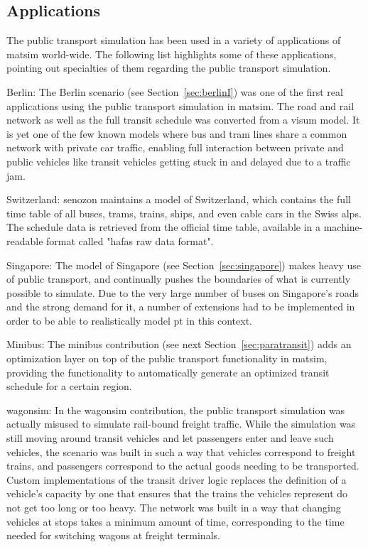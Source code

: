 \subsection{Applications}
The public transport simulation has been used in a variety of applications of
\gls{matsim} world-wide. The following list highlights some of these applications,
pointing out specialties of them regarding the public transport simulation.

\begin{compactitem}
	\item Berlin: The Berlin scenario (see Section~\ref{sec:berlinI}) was one of
	the first real applications using the public transport simulation in \gls{matsim}.
	The road and rail network as well as the full transit schedule was converted
	from a \gls{visum} model. It is yet one of the few known models where bus and tram
	lines share a common network with private car traffic, enabling full
	interaction between private and public vehicles like transit vehicles getting
	stuck in and delayed due to a traffic jam.
	\item Switzerland: \gls{senozon} maintains a model of Switzerland, which contains the
	full time table of all buses, trams, trains, ships, and even cable cars in the
	Swiss alps. The schedule data is retrieved from the official time table,
	available in a machine-readable format called "\gls{hafas} raw data format".
	\item Singapore: The model of Singapore (see Section~\ref{sec:singapore}) makes
	heavy use of public transport, and continually pushes the boundaries of what is
	currently possible to simulate. Due to the very large number of buses on
	Singapore's roads and the strong demand for it, a number of extensions had to
	be implemented in order to be able to realistically model pt in this context.
	\item Minibus: The minibus contribution (see next Section~\ref{sec:paratransit}) 
	adds an optimization layer on top of the public
	transport functionality in \gls{matsim}, providing the functionality to automatically
	generate an optimized transit schedule for a certain region.
	\item wagonsim: In the wagonsim contribution, %
	the public transport simulation was actually misused to simulate
	rail-bound freight traffic. While the simulation was still moving around
	transit vehicles and let passengers enter and leave such vehicles, the scenario
	was built in such a way that vehicles correspond to freight trains, and
	passengers correspond to the actual goods needing to be transported. Custom
	implementations of the transit driver logic replaces the definition of a
	vehicle's capacity by one that ensures that the trains the vehicles represent
	do not get too long or too heavy. The network was built in a way that changing
	vehicles at stops takes a minimum amount of time, corresponding to the time
	needed for switching wagons at freight terminals.
\end{compactitem}

